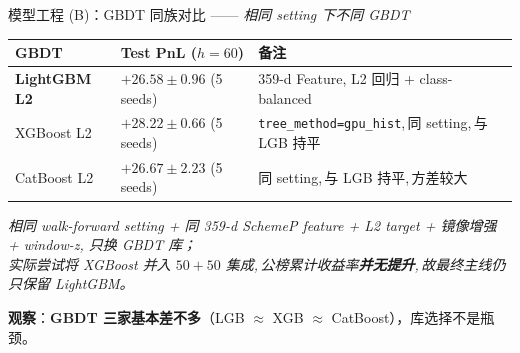 \documentclass[aspectratio=169,11pt]{beamer}
\newcommand{\rhl}[1]{\textcolor{accred}{\textbf{#1}}}
\begin{document}
\begin{frame}{模型工程 (B)：GBDT 同族对比 —— \emph{相同 setting 下不同 GBDT}}
  \vspace{-2pt}
  \begin{center}
    \setlength{\tabcolsep}{4pt}\renewcommand{\arraystretch}{1.15}
    \scriptsize
    \begin{tabular}{@{}p{3.0cm}p{4.0cm}p{5.0cm}@{}}
      \toprule
      \textbf{GBDT} & \textbf{Test PnL ($h{=}60$)} & \textbf{备注} \\
      \midrule
      \rhl{LightGBM L2}  & \rhl{$+26.58 \pm 0.96$}\,\,(5 seeds) & 359-d Feature, L2 回归 + class-balanced \\
      XGBoost L2         & $+28.22 \pm 0.66$\,\,(5 seeds)        & \texttt{tree\_method=gpu\_hist},\,同 setting,\,与 LGB 持平 \\
      CatBoost L2        & $+26.67 \pm 2.23$\,\,(5 seeds)        & 同 setting,\,与 LGB 持平,\,方差较大 \\
      \bottomrule
    \end{tabular}
  \end{center}
  \vspace{1pt}
  \begin{center}\tiny\itshape
    相同 walk-forward setting + 同 359-d SchemeP feature + L2 target + 镜像增强 + window-z, 只换 GBDT 库；\\
    实际尝试将 XGBoost 并入 $50{+}50$ 集成,\,公榜累计收益率\textbf{并无提升},\,故最终主线仍只保留 LightGBM。
  \end{center}

  \vspace{6pt}
  \begin{center}\scriptsize
    \textbf{\color{icmlblue}观察}：\textbf{GBDT 三家基本差不多}（LGB $\approx$ XGB $\approx$ CatBoost），库选择不是瓶颈。
  \end{center}
\end{frame}
\end{document}
